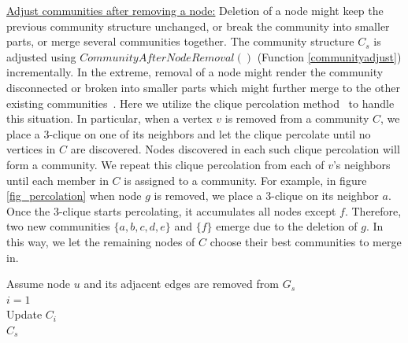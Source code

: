 \noindent \underline{Adjust communities after removing a node:} 
Deletion of a node might keep the previous community structure unchanged, or break the community into smaller parts, or merge several communities together. The community structure $C_s$ is adjusted using  $CommunityAfterNodeRemoval()$ (Function \ref{communityadjust}) incrementally.  In the extreme,
removal of a node might render the community disconnected 
or broken into smaller parts which might further merge to the other existing communities~\cite{pone.0091431}. Here we utilize the clique percolation method~\cite{PalEtAl05} to handle this situation. In particular, when a vertex $v$ is removed from a community $C$, we place a 3-clique on one of its neighbors and let the clique percolate until no vertices in $C$ are discovered. Nodes discovered in each such clique percolation will form a community. We repeat this clique percolation from each of $v$'s neighbors until each member in $C$ is assigned to a community. For example, in figure \ref{fig_percolation} when node $g$ is removed, we place a 3-clique on its neighbor $a$. Once the 3-clique starts percolating, it accumulates all nodes except $f$. Therefore, two new communities $\{a,b,c,d,e\}$ and $\{f\}$  emerge due to the deletion of $g$. In this way, we let the remaining nodes of $C$ choose their best communities to merge in. %
\begin{function6}[!ht]
\caption{\small$CommunityAfterNodeRemoval(u,C_s)$}
\label{communityadjust}
Assume node $u$ and its adjacent edges are removed from $G_s$\\
$i=1$\\
Update $C_i$\\%
\Return $C_s$   
\end{function6}



